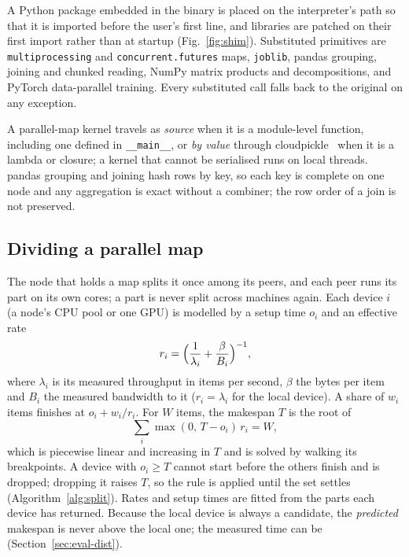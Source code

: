 \documentclass[5p,times,twocolumn]{elsarticle}
\begin{document}
A Python package embedded in the binary is placed on the interpreter's path so
that it is imported before the user's first line, and libraries are patched on
their first import rather than at startup (Fig.~\ref{fig:shim}). Substituted
primitives are \texttt{multiprocessing} and \texttt{concurrent.futures} maps,
\texttt{joblib}, pandas grouping, joining and chunked reading, NumPy matrix
products and decompositions, and PyTorch data-parallel training. Every
substituted call falls back to the original on any exception.

A parallel-map kernel travels as \emph{source} when it is a module-level
function, including one defined in \texttt{\_\_main\_\_}, or \emph{by value}
through cloudpickle~\cite{cloudpickle} when it is a lambda or closure; a kernel
that cannot be serialised runs on local threads. pandas grouping and joining
hash rows by key, so each key is complete on one node and any aggregation is
exact without a combiner; the row order of a join is not preserved.

\subsection{Dividing a parallel map}
\label{sec:split}

The node that holds a map splits it once among its peers, and each peer runs
its part on its own cores; a part is never split across machines again. Each
device $i$ (a node's CPU pool or one GPU) is modelled by a setup time $o_i$ and
an effective rate
\begin{equation}
\label{eq:rate}
r_i = \Bigl(\frac{1}{\lambda_i} + \frac{\beta}{B_i}\Bigr)^{-1},
\end{equation}
where $\lambda_i$ is its measured throughput in items per second, $\beta$ the
bytes per item and $B_i$ the measured bandwidth to it ($r_i=\lambda_i$ for the
local device). A share of $w_i$ items finishes at $o_i + w_i/r_i$. For $W$
items, the makespan $T$ is the root of
\begin{equation}
\label{eq:makespan}
\sum_i \max(0,\,T-o_i)\,r_i = W ,
\end{equation}
which is piecewise linear and increasing in $T$ and is solved by walking its
breakpoints. A device with $o_i \ge T$ cannot start before the others finish
and is dropped; dropping it raises $T$, so the rule is applied until the set
settles (Algorithm~\ref{alg:split}). Rates and setup times are fitted from the
parts each device has returned. Because the local device is always a
candidate, the \emph{predicted} makespan is never above the local one; the
measured time can be (Section~\ref{sec:eval-dist}).
\end{document}
